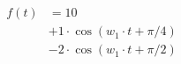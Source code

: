 \begin{center}
\begin{align*}
f(t) &= 10 \\
&+ 1 \cdot \cos( w_1 \cdot t +\pi/4 ) \\
&- 2 \cdot \cos( w_1 \cdot t +\pi/2)
\end{align*}
\end{center}
